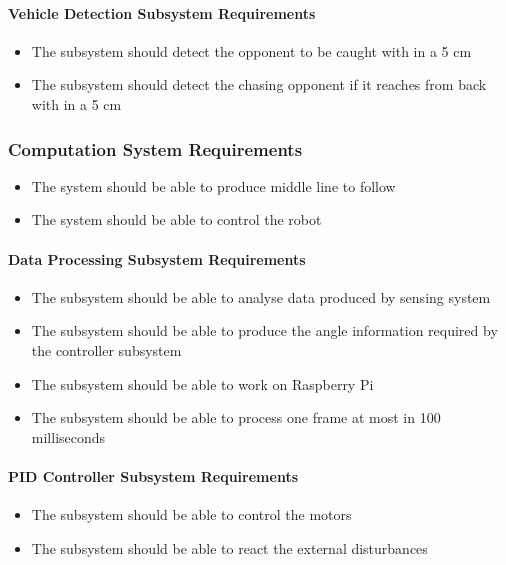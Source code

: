 \documentclass[a4paper,12pt]{article}
\begin{document}
	 
	\paragraph{Vehicle Detection Subsystem Requirements}
	
		\begin{itemize}
			\item The subsystem should detect the opponent to be caught with in a 5 cm 
			\item The subsystem should detect the chasing opponent if it reaches from back with in a 5 cm  
		\end{itemize}
		
		
	\subsubsection{Computation System Requirements}
		
		\begin{itemize}
			\item The system should	be able to produce middle line to follow
			\item The system should be able to control the robot
		\end{itemize}			
	
	
	\paragraph{Data Processing Subsystem Requirements}	
	
		\begin{itemize}
			\item The subsystem should be able to analyse data produced by sensing system
			\item The subsystem should be able to produce the angle information required by the controller subsystem
			\item The subsystem should be able to work on Raspberry Pi
			\item The subsystem should be able to process one frame at most in 100 milliseconds
		\end{itemize}
		
	\paragraph{PID Controller Subsystem Requirements}
	
		\begin{itemize}
			\item The subsystem should be able to control the motors
			\item The subsystem should be able to react the external disturbances
		\end{itemize}
	
\end{document}
